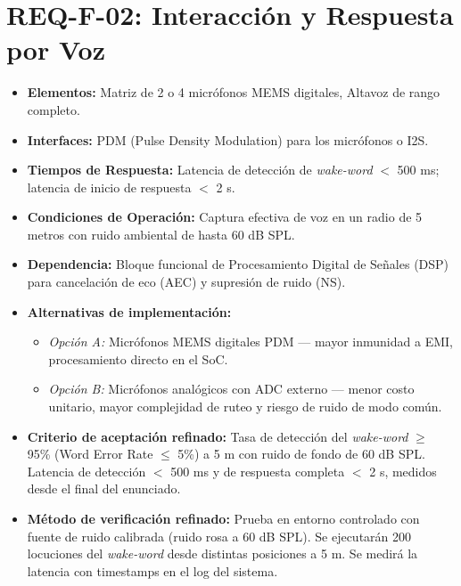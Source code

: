 \documentclass[%
	paper=a4,
	twoside=false,
	parskip=half,
	chapterprefix=false,
	10pt,
	headings=normal,
	bibliography=totoc,
	listof=totoc,
	titlepage=on,
	captions=tableabove,
	draft=false, 
]{scrbook}%
\begin{document}
\section{REQ-F-02: Interacción y Respuesta por Voz}
\begin{itemize}
    \item \textbf{Elementos:} Matriz de 2 o 4 micrófonos MEMS digitales, Altavoz de rango completo.
    \item \textbf{Interfaces:} PDM (Pulse Density Modulation) para los micrófonos o I2S.
    \item \textbf{Tiempos de Respuesta:} Latencia de detección de \textit{wake-word} $<$ 500 ms; latencia de inicio de respuesta $<$ 2 s.
    \item \textbf{Condiciones de Operación:} Captura efectiva de voz en un radio de 5 metros con ruido ambiental de hasta 60 dB SPL.
    \item \textbf{Dependencia:} Bloque funcional de Procesamiento Digital de Señales (DSP) para cancelación de eco (AEC) y supresión de ruido (NS).
    \item \textbf{Alternativas de implementación:}
        \begin{itemize}
            \item \textit{Opción A:} Micrófonos MEMS digitales PDM — mayor inmunidad a EMI, procesamiento directo en el SoC.
            \item \textit{Opción B:} Micrófonos analógicos con ADC externo — menor costo unitario, mayor complejidad de ruteo y riesgo de ruido de modo común.
        \end{itemize}
    \item \textbf{Criterio de aceptación refinado:} Tasa de detección del \textit{wake-word} $\geq$ 95\% (Word Error Rate $\leq$ 5\%) a 5 m con ruido de fondo de 60 dB SPL. Latencia de detección $<$ 500 ms y de respuesta completa $<$ 2 s, medidos desde el final del enunciado.
    \item \textbf{Método de verificación refinado:} Prueba en entorno controlado con fuente de ruido calibrada (ruido rosa a 60 dB SPL). Se ejecutarán 200 locuciones del \textit{wake-word} desde distintas posiciones a 5 m. Se medirá la latencia con timestamps en el log del sistema.
\end{itemize}

\end{document}
